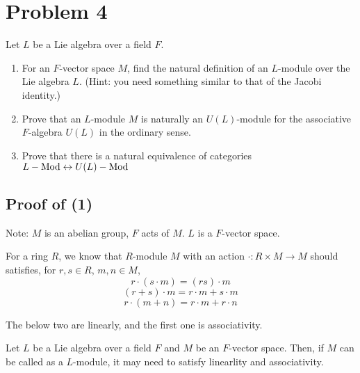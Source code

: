 \section*{Problem 4}

Let \(L\) be a Lie algebra over a field \(F\).

\begin{enumerate}[label=(\arabic*)]
\item
  For an \(F\)-vector space \(M\),
  find the natural definition of an \(L\)-module over the Lie algebra \(L\).
  (Hint: you need something similar to that of the Jacobi identity.)
\item
  Prove that an \(L\)-module \(M\) is naturally an \(U(L)\)-module
  for the associative \(F\)-algebra \(U(L)\) in the ordinary sense.
\item
  Prove that there is a natural equivalence of categories
  \(L-\textnormal{Mod} \leftrightarrow U(L)-\textnormal{Mod}\)
\end{enumerate}

\subsection*{Proof of (1)}

Note: \(M\) is an abelian group, \(F\) acts of \(M\).
\(L\) is a \(F\)-vector space.

For a ring \(R\), we know that \(R\)-module \(M\)
with an action \(\cdot: R \times M \to M\) should satisfies,
for \(r, s \in R\), \(m, n \in M\),
\[r \cdot (s \cdot m) =  (rs) \cdot m\]
\[(r + s) \cdot m = r \cdot m + s \cdot m\]
\[r \cdot (m + n) = r \cdot m + r \cdot n\]

The below two are linearly, and the first one is associativity.

Let \(L\) be a Lie algebra over a field \(F\)
and \(M\) be an \(F\)-vector space.
Then, if \(M\) can be called as a \(L\)-module,
it may need to satisfy linearlity and associativity.


